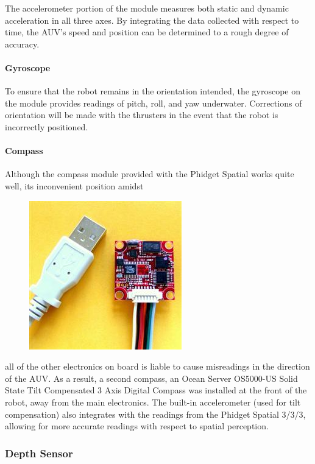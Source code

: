 \documentclass[12pt, letterpaper, twocolumn, titlepage]{article}
\begin{document}
The accelerometer portion of the module measures both static and dynamic acceleration in all three axes. By integrating the data collected with respect to time, the AUV's speed and position can be determined to a rough degree of accuracy.

\paragraph{Gyroscope}

To ensure that the robot remains in the orientation intended, the gyroscope on the module provides readings of pitch, roll, and yaw underwater. Corrections of orientation will be made with the thrusters in the event that the robot is incorrectly positioned.

\paragraph{Compass}

Although the compass module provided with the Phidget Spatial works quite well, its inconvenient position amidst
\begin{figure}
	\vspace{-30pt}
 	\flushright
   	\includegraphics[width=0.4\columnwidth]{Compass}
   	\vspace{-30pt}
\end{figure}
all of the other electronics on board is liable to cause misreadings in the direction of the AUV. As a result, a second compass, an Ocean Server OS5000-US Solid State Tilt Compensated 3 Axis Digital Compass was installed at the front of the robot, away from the main electronics. The built-in accelerometer (used for tilt compensation) also integrates with the readings from the Phidget Spatial 3/3/3, allowing for more accurate readings with respect to spatial perception.


\subsubsection{Depth Sensor}
\end{document}
